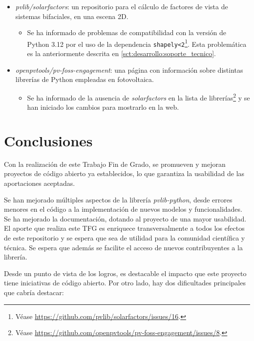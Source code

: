 \begin{itemize}
    \item \textit{pvlib/solarfactors}: un repositorio para el cálculo de factores de vista de sistemas bifaciales, en una escena 2D.
    \begin{itemize}
        \item Se ha informado de problemas de compatibilidad con la versión de Python 3.12 por el uso de la dependencia \texttt{shapely<2}\footnote{Véase \url{https://github.com/pvlib/solarfactors/issues/16}.}. Esta problemática es la anteriormente descrita en \ref{sct:desarrollo:soporte_tecnico}.
    \end{itemize}
    \item \textit{openpvtools/pv-foss-engagement}: una página con información sobre distintas librerías de Python empleadas en fotovoltaica.
    \begin{itemize}
        \item Se ha informado de la ausencia de \textit{solarfactors} en la lista de librerías\footnote{Véase \url{https://github.com/openpvtools/pv-foss-engagement/issues/8}.} y se han iniciado los cambios para mostrarlo en la web.
    \end{itemize}
\end{itemize}


\section{Conclusiones} \label{sct:resultados:conclusiones}

Con la realización de este Trabajo Fin de Grado, se promueven y mejoran proyectos de código abierto ya establecidos, lo que garantiza la usabilidad de las aportaciones aceptadas.

Se han mejorado múltiples aspectos de la librería \textit{pvlib-python}, desde errores menores en el código a la implementación de nuevos modelos y funcionalidades. Se ha mejorado la documentación, dotando al proyecto de una mayor usabilidad. El aporte que realiza este TFG es enriquece transversalmente a todos los efectos de este repositorio y se espera que sea de utilidad para la comunidad científica y técnica. Se espera que además se facilite el acceso de nuevos contribuyentes a la librería.

Desde un punto de vista de los logros, es destacable el impacto que este proyecto tiene iniciativas de código abierto. Por otro lado, hay dos dificultades principales que cabría destacar:

